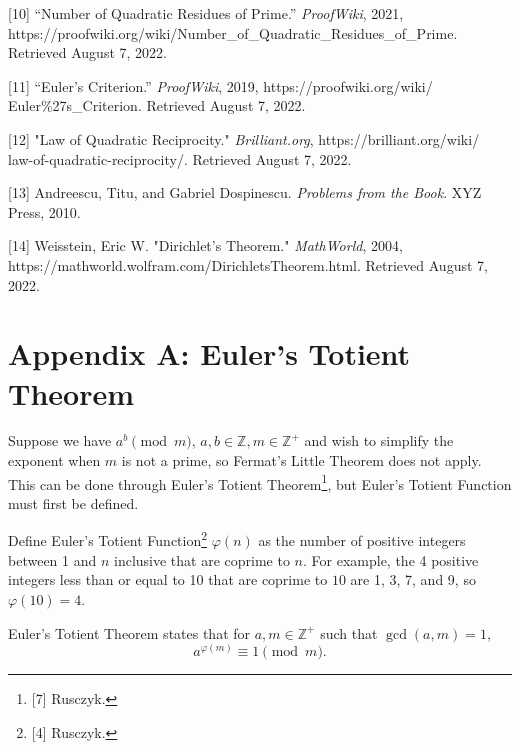 \documentclass{article}
\newcommand{\Z}{\mathbb{Z}}
\newcommand{\p}{\varphi}
\begin{document}
[10] “Number of Quadratic Residues of Prime.” \textit{ProofWiki}, 2021,\\ https://proofwiki.org/wiki/Number\_of\_Quadratic\_Residues\_of\_Prime. \\ Retrieved August 7, 2022.

[11] “Euler's Criterion.” \textit{ProofWiki}, 2019, https://proofwiki.org/wiki/\\ Euler\%27s\_Criterion. Retrieved August 7, 2022.

[12] "Law of Quadratic Reciprocity." \textit{Brilliant.org}, https://brilliant.org/wiki/\\ law-of-quadratic-reciprocity/. Retrieved August 7, 2022.

[13] Andreescu, Titu, and Gabriel Dospinescu. \textit{Problems from the Book}. XYZ Press, 2010.

[14] Weisstein, Eric W. "Dirichlet's Theorem." \textit{MathWorld}, 2004, \\ https://mathworld.wolfram.com/DirichletsTheorem.html. Retrieved August 7, 2022.
\newpage
\section{Appendix A: Euler's Totient Theorem}
Suppose we have $a^b \pmod m$, $a, b \in \Z, m \in \Z^+$ and wish to simplify the exponent when $m$ is not a prime, so Fermat's Little Theorem does not apply. This can be done through Euler's Totient Theorem\footnote{[7] Rusczyk.}, but Euler's Totient Function must first be defined.

Define Euler's Totient Function\footnote{[4] Rusczyk.} $\p(n)$ as the number of positive integers between 1 and $n$ inclusive that are coprime to $n$. For example, the 4 positive integers less than or equal to 10 that are coprime to $10$ are 1, 3, 7, and 9, so $\p(10)=4$.

Euler's Totient Theorem states that for $a, m \in \Z^+$ such that $\gcd(a,m) = 1$, \[a^{\p(m)} \equiv 1 \pmod m.\]
\end{document}
